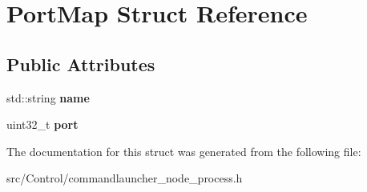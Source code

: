 \hypertarget{structPortMap}{}\section{Port\+Map Struct Reference}
\label{structPortMap}
\subsection*{Public Attributes}
\begin{DoxyCompactItemize}
\item 
\mbox{\label{structPortMap_ad4f268b69527eb3277115cf280e40e00}} 
std\+::string {\bfseries name}
\item 
\mbox{\label{structPortMap_a03cbfa0293b8acb248a43b5b43847a59}} 
uint32\+\_\+t {\bfseries port}
\end{DoxyCompactItemize}


The documentation for this struct was generated from the following file\+:\begin{DoxyCompactItemize}
\item 
src/\+Control/commandlauncher\+\_\+node\+\_\+process.\+h\end{DoxyCompactItemize}
